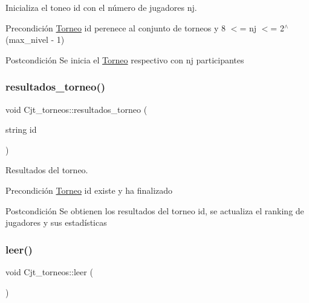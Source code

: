 Inicializa el toneo id con el número de jugadores nj. 

\begin{DoxyPrecond}{Precondición}
\hyperlink{class_torneo}{Torneo} id perenece al conjunto de torneos y 8 $<$= nj $<$= 2$^\wedge$(max\+\_\+nivel -\/ 1) 
\end{DoxyPrecond}
\begin{DoxyPostcond}{Postcondición}
Se inicia el \hyperlink{class_torneo}{Torneo} respectivo con nj participantes 
\end{DoxyPostcond}
\mbox{\label{class_cjt__torneos_aa61972563342ca00b87a3c9b0ea78b6c}} 
\subsubsection{\texorpdfstring{resultados\+\_\+torneo()}{resultados\_torneo()}}
{\footnotesize\ttfamily void Cjt\+\_\+torneos\+::resultados\+\_\+torneo (\begin{DoxyParamCaption}\item[{string}]{id }\end{DoxyParamCaption})}



Resultados del torneo. 

\begin{DoxyPrecond}{Precondición}
\hyperlink{class_torneo}{Torneo} id existe y ha finalizado 
\end{DoxyPrecond}
\begin{DoxyPostcond}{Postcondición}
Se obtienen los resultados del torneo id, se actualiza el ranking de jugadores y sus estadísticas 
\end{DoxyPostcond}
\mbox{\label{class_cjt__torneos_af0f18e3971687674b58d020689fa2203}} 
\subsubsection{\texorpdfstring{leer()}{leer()}}
{\footnotesize\ttfamily void Cjt\+\_\+torneos\+::leer (\begin{DoxyParamCaption}{ }\end{DoxyParamCaption})}



